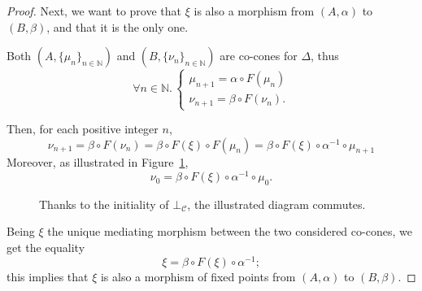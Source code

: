\begin{proof}
  Next, we want to prove that \(\xi\) is also a morphism from \((A,\alpha)\) to \((B,\beta)\), and that it is the only one.
  
  Both \((A,\lbrace \mu_n \rbrace_{n \in \mathbb{N}})\) and \((B,\lbrace \nu_n \rbrace_{n \in \mathbb{N}})\) are co-cones for \(\Delta\), thus
  \begin{equation}
    \forall n \in \mathbb{N}.\,
    \begin{cases}
      \mu_{n+1} = \alpha \circ F(\mu_n) \\
      \nu_{n+1} = \beta \circ F(\nu_n).
    \end{cases}
  \end{equation}
  
  Then, for each positive integer \(n\),
  \begin{equation}
    \nu_{n+1} = \beta \circ F(\nu_n) = \beta \circ F(\xi) \circ F(\mu_n)
     = \beta \circ F(\xi) \circ \alpha^{-1} \circ \mu_{n+1}
  \end{equation}
  Moreover, as illustrated in Figure~\ref{02:diagram-3},
  \begin{equation}
    \nu_{0} = \beta \circ F(\xi) \circ \alpha^{-1} \circ \mu_{0}. 
  \end{equation}
  \begin{figure}[!ht]
    \begin{center}
    \end{center}
    \caption{Thanks to the initiality of \(\bot_{\mathcal{C}}\), the illustrated diagram commutes.}
    \label{02:diagram-3}
  \end{figure}
  
  Being \(\xi\) the unique mediating morphism between the two considered co-cones, we get the equality
  \begin{equation}
    \label{eqn:asd}
    \xi = \beta \circ F(\xi) \circ \alpha^{-1};
  \end{equation}
  this implies that \(\xi\) is also a morphism of fixed points from \((A,\alpha)\) to \((B,\beta)\).
  

\end{proof}
